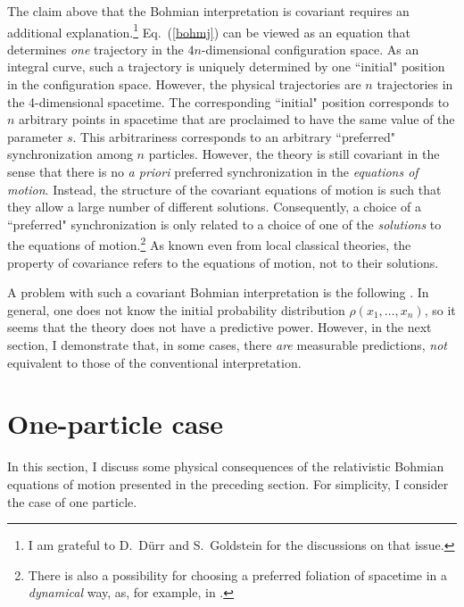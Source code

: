 \documentclass[12pt]{article} %
\begin{document}
The claim above that the Bohmian interpretation is covariant
requires an additional explanation.\footnote{I am 
grateful to D.~D\"urr and
S.~Goldstein for the discussions on that issue.}
Eq.~(\ref{bohmj}) can be viewed as an equation that determines 
{\em one} trajectory in the $4n$-dimensional configuration space. As an 
integral curve, such a trajectory is uniquely determined 
by one ``initial" position in the configuration space.
However, the physical trajectories are $n$ trajectories
in the 4-dimensional spacetime. The corresponding ``initial"
position corresponds to $n$ arbitrary points in spacetime 
that are proclaimed to have the same 
value of the parameter $s$. This arbitrariness corresponds 
to an arbitrary ``preferred" synchronization among $n$ particles.   
However, the theory is still 
covariant in the sense that there is no {\it a priori} 
preferred synchronization in the {\em equations of motion}. 
Instead, the structure of the covariant equations of motion 
is such that they allow a large number of different solutions.
Consequently, a choice of a ``preferred" synchronization
is only related to a choice of one of the {\em solutions}
to the equations of motion.\footnote{There is also a possibility 
for choosing a preferred foliation of spacetime in a 
{\em dynamical} way, as, for example, in \cite{durr99,nikolepjc}.} 
As known even from local classical theories,
the property of covariance refers to the equations of motion,
not to their solutions. 

A problem with such a covariant Bohmian interpretation 
is the following \cite{bern}.
In general, one does not know the initial probability 
distribution $\rho(x_1,\ldots ,x_n)$, so it seems that the theory 
does not have a predictive power. However,
in the next section, I demonstrate that, in some cases, there {\em are} 
measurable predictions, {\em not} equivalent to those of the conventional 
interpretation. 


\section{One-particle case}

In this section, I discuss some physical consequences of the 
relativistic Bohmian equations of motion presented in the 
preceding section.
For simplicity, I consider the case of one particle.
\end{document}
